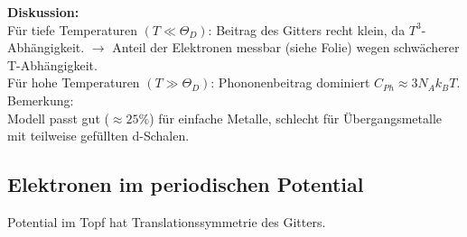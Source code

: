 \begin{itemize}
\textbf{Diskussion:} \\
Für tiefe Temperaturen $(T \ll \Theta_D)$: Beitrag des Gitters recht klein, da $T^3$-Abhängigkeit. $\rightarrow$ Anteil der Elektronen messbar (siehe Folie) wegen schwächerer T-Abhängigkeit. \\
Für hohe Temperaturen $(T \gg \Theta_D)$: Phononenbeitrag dominiert $C_{Ph} \approx 3 N_A k_B T$. \\
Bemerkung: \\
Modell passt gut ($\approx 25 \%$) für einfache Metalle, schlecht für Übergangsmetalle mit teilweise gefüllten d-Schalen.

\end{itemize}

\subsection{Elektronen im periodischen Potential} \label{kap:5_2}
Potential im Topf hat Translationssymmetrie des Gitters.
